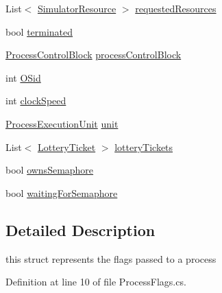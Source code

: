 \begin{DoxyCompactItemize}
\item 
List$<$ \hyperlink{class_c_p_u___o_s___simulator_1_1_operating___system_1_1_simulator_resource}{Simulator\+Resource} $>$ \hyperlink{struct_c_p_u___o_s___simulator_1_1_operating___system_1_1_process_flags_afa8f450b4825d1c204817af22729c05b}{requested\+Resources}
\item 
bool \hyperlink{struct_c_p_u___o_s___simulator_1_1_operating___system_1_1_process_flags_a5986a802a1f22f726209aba6d52f7e9c}{terminated}
\item 
\hyperlink{class_c_p_u___o_s___simulator_1_1_operating___system_1_1_process_control_block}{Process\+Control\+Block} \hyperlink{struct_c_p_u___o_s___simulator_1_1_operating___system_1_1_process_flags_adca49f9a3ee1f5e380a7547b0b8b73d6}{process\+Control\+Block}
\item 
int \hyperlink{struct_c_p_u___o_s___simulator_1_1_operating___system_1_1_process_flags_a819f86c160d64c6f4cbba56418cb688e}{O\+Sid}
\item 
int \hyperlink{struct_c_p_u___o_s___simulator_1_1_operating___system_1_1_process_flags_a28dbea54b61ff7f12d5dc8c3c40f632d}{clock\+Speed}
\item 
\hyperlink{class_c_p_u___o_s___simulator_1_1_operating___system_1_1_process_execution_unit}{Process\+Execution\+Unit} \hyperlink{struct_c_p_u___o_s___simulator_1_1_operating___system_1_1_process_flags_a6168635b7297d4ede7af0b1fce2e3db6}{unit}
\item 
List$<$ \hyperlink{class_c_p_u___o_s___simulator_1_1_operating___system_1_1_lottery_ticket}{Lottery\+Ticket} $>$ \hyperlink{struct_c_p_u___o_s___simulator_1_1_operating___system_1_1_process_flags_aa4893622ce512bb83c4970dc899d8452}{lottery\+Tickets}
\item 
bool \hyperlink{struct_c_p_u___o_s___simulator_1_1_operating___system_1_1_process_flags_a74079b8eb14af8005ed9c76f92bbf4db}{owns\+Semaphore}
\item 
bool \hyperlink{struct_c_p_u___o_s___simulator_1_1_operating___system_1_1_process_flags_af004c9597bef484bbb8eb43538818e58}{waiting\+For\+Semaphore}
\end{DoxyCompactItemize}


\subsection{Detailed Description}
this struct represents the flags passed to a process 



Definition at line 10 of file Process\+Flags.\+cs.



